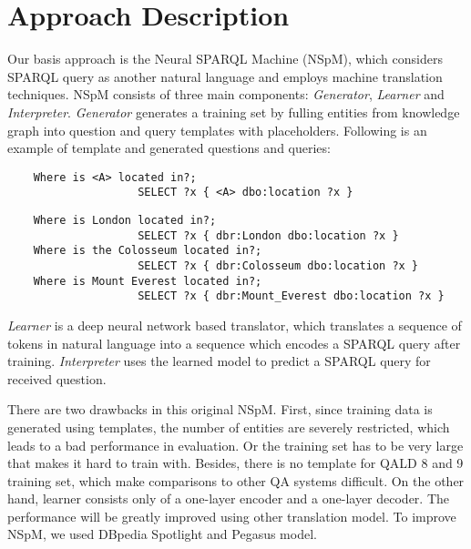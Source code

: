 
\section{Approach Description}

Our basis approach is the Neural SPARQL Machine (NSpM)\cite{soru-marx-nampi2018},
which considers SPARQL query as another natural language and employs machine translation techniques. 
NSpM consists of three main components: 
\textit{Generator}, \textit{Learner} and \textit{Interpreter}. 
\textit{Generator} generates a training set
by fulling entities from knowledge graph into question and query templates with placeholders. 
Following is an example of template and generated questions and queries:

\begin{verbatim}
    Where is <A> located in?; 
                    SELECT ?x { <A> dbo:location ?x }
\end{verbatim}

\begin{verbatim}
    Where is London located in?; 
                    SELECT ?x { dbr:London dbo:location ?x }
    Where is the Colosseum located in?; 
                    SELECT ?x { dbr:Colosseum dbo:location ?x }
    Where is Mount Everest located in?; 
                    SELECT ?x { dbr:Mount_Everest dbo:location ?x }
\end{verbatim}

\textit{Learner} is a deep neural network based translator, 
which translates a sequence of tokens in natural language
into a sequence which encodes a SPARQL query after training.
\textit{Interpreter} uses the learned model to predict a SPARQL query for received question.

There are two drawbacks in this original NSpM.
First, since training data is generated using templates, 
the number of entities are severely restricted,
which leads to a bad performance in evaluation.
Or the training set has to be very large
that makes it hard to train with. 
Besides, there is no template for QALD 8 and 9 training set,
which make comparisons to other QA systems difficult. 
On the other hand, 
learner consists only of a one-layer encoder and a one-layer decoder.
The performance will be greatly improved using other translation model.
To improve NSpM, we used DBpedia Spotlight and Pegasus model. 

